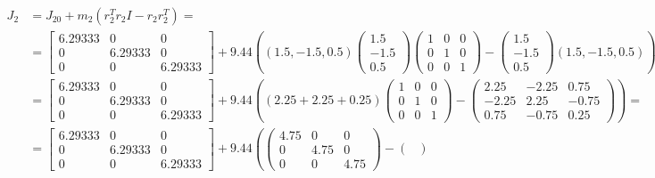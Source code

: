 \documentclass[a4paper]{article}
\begin{document}
	\begin{align*}
		J_2 &= J_{20} + m_2(r_2^Tr_2I-r_2r_2^T) =
		\\
		&= \begin{bmatrix}
			6.29333 & 0 & 0 \\
			0 & 6.29333 & 0 \\
			0 & 0 & 6.29333
		\end{bmatrix} +
		9.44
		\left(
		(1.5, -1.5, 0.5)
		\begin{pmatrix}
			1.5 \\ -1.5 \\ 0.5
		\end{pmatrix}
		\begin{pmatrix}
			1 & 0 & 0 \\
			0 & 1 & 0 \\
			0 & 0 & 1
		\end{pmatrix}
		-
		\begin{pmatrix}
			1.5 \\ -1.5 \\ 0.5
		\end{pmatrix}
		(1.5, -1.5, 0.5)
		\right) =
		\\
		&= \begin{bmatrix}
			6.29333 & 0 & 0 \\
			0 & 6.29333 & 0 \\
			0 & 0 & 6.29333
		\end{bmatrix} +
		9.44
		\left(
		(2.25 + 2.25 + 0.25)
		\begin{pmatrix}
			1 & 0 & 0 \\
			0 & 1 & 0 \\
			0 & 0 & 1
		\end{pmatrix}
		-
		\begin{pmatrix}
			2.25 & -2.25 &  0.75 \\
			-2.25 &  2.25 & -0.75 \\
			0.75 & -0.75 &  0.25
		\end{pmatrix}
		\right) =
		\\
		&= \begin{bmatrix}
			6.29333 & 0 & 0 \\
			0 & 6.29333 & 0 \\
			0 & 0 & 6.29333
		\end{bmatrix} +
		9.44
		\left(
		\begin{pmatrix}
			4.75 & 0 & 0 \\
			0 & 4.75 & 0 \\
			0 & 0 & 4.75
		\end{pmatrix}
		-
		\begin{pmatrix}

\end{pmatrix}
\end{align*}
\end{document}
